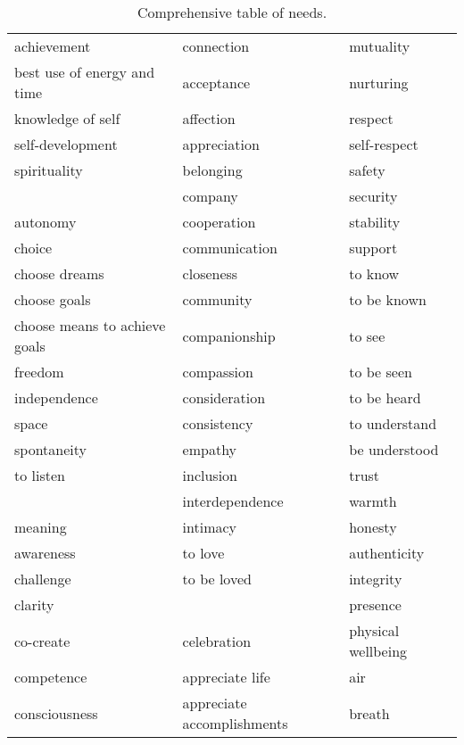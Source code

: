 \begin{small}
        \begin{longtable}{L{0.33\textwidth}  L{0.33\textwidth}  L{0.22\textwidth} }
                \caption{Comprehensive table of needs. \label{table:needs-all}} \\[-.5em]
                \toprule
                achievement & connection & mutuality \\
                best use of energy and time & acceptance & nurturing \\
                knowledge of self & affection & respect \\
                self-development & appreciation & self-respect \\
                spirituality & belonging & safety\\
                & company & security\\
                autonomy & cooperation & stability\\
                choice & communication & support \\
                choose dreams & closeness & to know \\
                choose goals & community & to be known \\
                choose means to achieve goals & companionship & to see \\
                freedom & compassion & to be seen \\
                independence & consideration & to be heard \\
                space & consistency & to understand \\
                spontaneity & empathy & be understood \\
                to listen & inclusion & trust \\
                & interdependence & warmth \\
                meaning & intimacy & honesty \\
                awareness & to love & authenticity\\
                challenge & to be loved & integrity \\
                clarity & & presence \\
                co-create & celebration & physical wellbeing \\
                competence & appreciate life & air \\
                consciousness & appreciate accomplishments & breath \\

\end{longtable}
\end{small}
